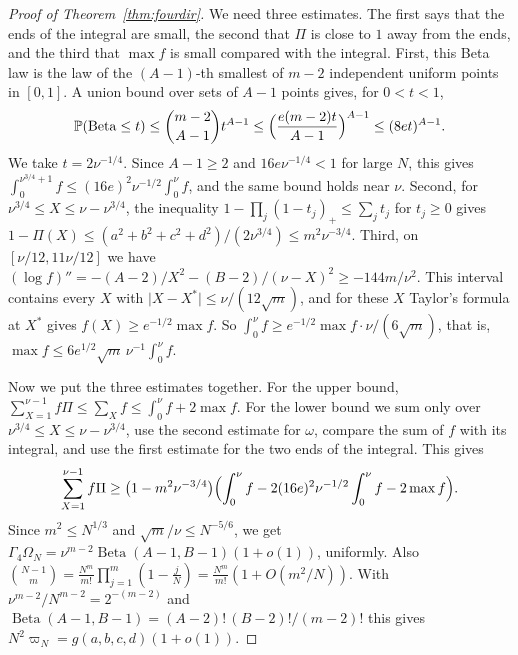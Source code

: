 \begin{proof}[Proof of Theorem~\ref{thm:fourdir}]
We need three estimates. The first says that the ends of the integral are small, the second that
$\Pi$ is close to $1$ away from the ends, and the third that $\max f$ is small compared with the
integral. First, this Beta law is the law of the $(A-1)$-th smallest of $m-2$
independent uniform points in $[0,1]$. A union bound over sets of $A-1$ points gives, for $0<t<1$,
\[
 \mathbb{P}(\mathrm{Beta}\le t)\le\binom{m-2}{A-1}t^{A-1}\le\Bigl(\frac{e(m-2)t}{A-1}\Bigr)^{A-1}
 \le(8et)^{A-1}.
\]
We take $t=2\nu^{-1/4}$. Since $A-1\ge2$ and $16e\nu^{-1/4}<1$ for large $N$, this gives
$\int_0^{\nu^{3/4}+1}f\le(16e)^2\nu^{-1/2}\int_0^\nu f$, and the same bound holds near $\nu$. Second,
for $\nu^{3/4}\le X\le\nu-\nu^{3/4}$, the inequality $1-\prod_j(1-t_j)_+\le\sum_jt_j$ for $t_j\ge0$
gives $1-\Pi(X)\le(a^2+b^2+c^2+d^2)/(2\nu^{3/4})\le m^2\nu^{-3/4}$. Third, on
$[\nu/12,11\nu/12]$ we have
$(\log f)''=-(A-2)/X^2-(B-2)/(\nu-X)^2\ge-144m/\nu^2$. This interval contains every $X$ with
$\lvert X-X^*\rvert\le\nu/(12\sqrt m)$, and for these $X$ Taylor's formula at $X^*$ gives
$f(X)\ge e^{-1/2}\max f$. So $\int_0^\nu f\ge e^{-1/2}\max f\cdot\nu/(6\sqrt m)$, that is,
$\max f\le6e^{1/2}\sqrt m\,\nu^{-1}\int_0^\nu f$.

Now we put the three estimates together. For the upper bound,
$\sum_{X=1}^{\nu-1}f\Pi\le\sum_Xf\le\int_0^\nu f+2\max f$. For the lower bound we sum only over
$\nu^{3/4}\le X\le\nu-\nu^{3/4}$, use the second estimate for $\omega$, compare the sum of $f$ with
its integral, and use the first estimate for the two ends of the integral. This gives
\[
 \sum_{X=1}^{\nu-1}f\Pi\ge\bigl(1-m^2\nu^{-3/4}\bigr)
 \Bigl(\int_0^\nu f-2(16e)^2\nu^{-1/2}\int_0^\nu f-2\max f\Bigr).
\]
Since $m^2\le N^{1/3}$ and $\sqrt m/\nu\le N^{-5/6}$, we get
$\Gamma_4\Omega_N=\nu^{m-2}\operatorname{Beta}(A-1,B-1)(1+o(1))$, uniformly. Also
$\binom{N-1}m=\frac{N^m}{m!}\prod_{j=1}^m(1-\frac jN)=\frac{N^m}{m!}(1+O(m^2/N))$. With
$\nu^{m-2}/N^{m-2}=2^{-(m-2)}$ and $\operatorname{Beta}(A-1,B-1)=(A-2)!\,(B-2)!/(m-2)!$ this gives
$N^2\varpi_N=g(a,b,c,d)(1+o(1))$.


\end{proof}
